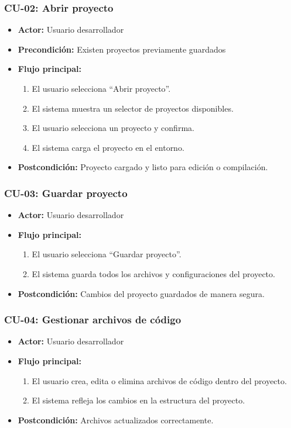 \documentclass[../../main.tex]{subfiles}
\begin{document}
\subsubsection*{CU-02: Abrir proyecto}
\begin{itemize}
    \item \textbf{Actor:} Usuario desarrollador
    \item \textbf{Precondición:} Existen proyectos previamente guardados
    \item \textbf{Flujo principal:}
        \begin{enumerate}
            \item El usuario selecciona ``Abrir proyecto''.
            \item El sistema muestra un selector de proyectos disponibles.
            \item El usuario selecciona un proyecto y confirma.
            \item El sistema carga el proyecto en el entorno.
        \end{enumerate}
    \item \textbf{Postcondición:} Proyecto cargado y listo para edición o compilación.
\end{itemize}

\clearpage

\subsubsection*{CU-03: Guardar proyecto}
\begin{itemize}
    \item \textbf{Actor:} Usuario desarrollador
    \item \textbf{Flujo principal:}
        \begin{enumerate}
            \item El usuario selecciona ``Guardar proyecto''.
            \item El sistema guarda todos los archivos y configuraciones del proyecto.
        \end{enumerate}
    \item \textbf{Postcondición:} Cambios del proyecto guardados de manera segura.
\end{itemize}

\subsubsection*{CU-04: Gestionar archivos de código}
\begin{itemize}
    \item \textbf{Actor:} Usuario desarrollador
    \item \textbf{Flujo principal:}
        \begin{enumerate}
            \item El usuario crea, edita o elimina archivos de código dentro del proyecto.
            \item El sistema refleja los cambios en la estructura del proyecto.
        \end{enumerate}
    \item \textbf{Postcondición:} Archivos actualizados correctamente.
\end{itemize}
\end{document}
